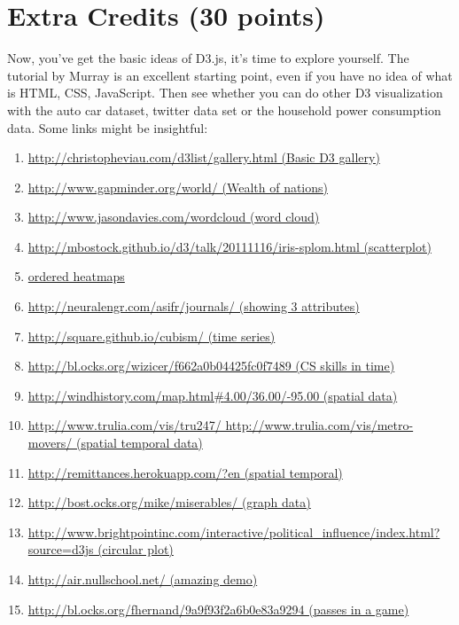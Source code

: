 \documentclass[a4paper, 11pt]{article}
\begin{document}
\section{Extra Credits (30 points)}
Now, you've get the basic ideas of D3.js, it's time to explore yourself. The tutorial by Murray is an excellent starting point, even if you have no idea of what is HTML, CSS, JavaScript. Then see whether you can do other D3 visualization with the auto car dataset, twitter data set or the household power consumption data. Some links might be insightful:
\begin{enumerate}
\item \href{http://christopheviau.com/d3list/gallery.html}{http://christopheviau.com/d3list/gallery.html (Basic D3 gallery)}
\item \href{http://www.gapminder.org/world/}{http://www.gapminder.org/world/ (Wealth of nations)}
\item \href{http://www.jasondavies.com/wordcloud}{ http://www.jasondavies.com/wordcloud (word cloud)}
\item \href{http://mbostock.github.io/d3/talk/20111116/iris-splom.html}{http://mbostock.github.io/d3/talk/20111116/iris-splom.html (scatterplot)}
\item \href{http://astro.temple.edu/~tuc17157/em_ordering/basic_v2_wave_classes_flip.html}{ ordered heatmaps}
\item \href{http://neuralengr.com/asifr/journals/} {http://neuralengr.com/asifr/journals/ (showing 3 attributes)}
\item \href{http://square.github.io/cubism/}{http://square.github.io/cubism/ (time series)}
\item \href{http://bl.ocks.org/wizicer/f662a0b04425fc0f7489}{http://bl.ocks.org/wizicer/f662a0b04425fc0f7489 (CS skills in time)}
\item \href{http://windhistory.com/map.html4.00/36.00/-95.00}{http://windhistory.com/map.html\#{4.00}/36.00/-95.00 (spatial data)}
\item \href{}{http://www.trulia.com/vis/tru247/ http://www.trulia.com/vis/metro-movers/ (spatial temporal data)}
\item \href{http://remittances.herokuapp.com/?en}{http://remittances.herokuapp.com/?en (spatial temporal)}
\item \href{http://bost.ocks.org/mike/miserables/}{http://bost.ocks.org/mike/miserables/  (graph data)}
\item \href{http://www.brightpointinc.com/interactive/political_influence/index.html?source=d3js}{http://www.brightpointinc.com/interactive/political\_influence/index.html?source=d3js (circular plot)}
\item \href{http://air.nullschool.net/}{http://air.nullschool.net/ (amazing demo)}
\item \href{http://bl.ocks.org/fhernand/9a9f93f2a6b0e83a9294}{http://bl.ocks.org/fhernand/9a9f93f2a6b0e83a9294 (passes in a game)}
\end{enumerate}
\end{document}
